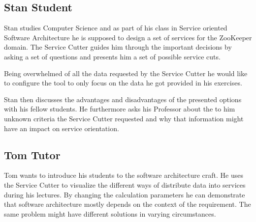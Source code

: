 

\subsection{Stan Student}

Stan studies Computer Science and as part of his class in Service oriented Software Architecture he is supposed to design a set of services for the ZooKeeper domain. The Service Cutter guides him through the important decisions by asking a set of questions and presents him a set of possible service cuts. 

Being overwhelmed of all the data requested by the Service Cutter he would like to configure the tool to only focus on the data he got provided in his exercises. 

Stan then discusses the advantages and disadvantages of the presented options with his fellow students. He furthermore asks his Professor about the to him unknown criteria the Service Cutter requested and why that information might have an impact on service orientation. 


\subsection{Tom Tutor}

Tom wants to introduce his students to the software architecture craft. He uses the Service Cutter to visualize the different ways of distribute data into services during his lectures. By changing the calculation parameters he can demonstrate that software architecture mostly depends on the context of the requirement. The same problem might have different solutions in varying circumstances.
